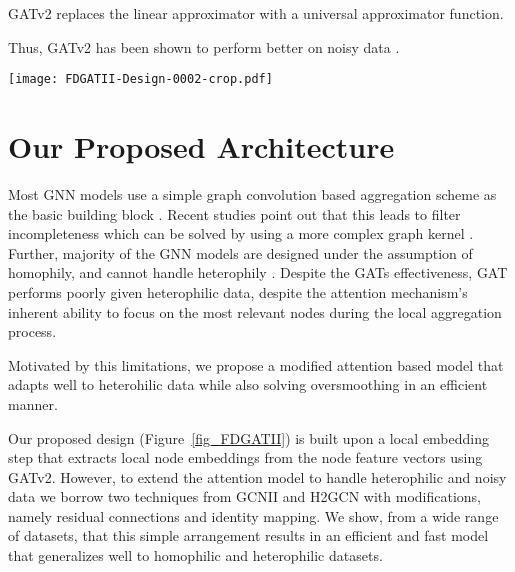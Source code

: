 \documentclass{article}
\begin{document}
GATv2 replaces the linear approximator with a universal approximator function. 
 
Thus, GATv2 has been shown to perform better on noisy data \cite{brody2021attentive}.

\begin{figure*}[t]
  \texttt{[image: FDGATII-Design-0002-crop.pdf]}
  \caption{FDGATII uses an initial representation obtained from the node features via  projection combined with attention and Identity  with  and  proportions respectively at each layer. The attention module concatenates source (row) and destination (column) features of each edge from the adjacency matrix  (with self-edges) projected via , applies a non-linearity (leaky-relu) followed by an  to obtain the edgewise attentions which is reshaped to a matrix suitable for the final softmax with the query. FDGATII can have multiple layers, followed by a final  projection (layer) and log softmax that provides the node classification.}
  \label{fig_FDGATII}
\end{figure*}

\section{Our Proposed Architecture}
Most GNN models use a simple graph convolution based aggregation scheme as the basic building block \cite{kipf2016semi, hamilton2017inductive}. Recent studies point out that this leads to filter incompleteness which can be solved by using a more complex graph kernel \cite{abu2019mixhop}. Further, majority of the GNN models are designed under the assumption of homophily, and cannot handle heterophily \cite{zhu2020beyond}. Despite the GATs effectiveness, GAT performs poorly given heterophilic data, despite the attention mechanism’s inherent ability to focus on the most relevant nodes during the local aggregation process. 

Motivated by this limitations, we propose a modified attention based model that adapts well to heterohilic data while also solving oversmoothing in an efficient manner. 

Our proposed design (Figure~\ref{fig_FDGATII}) is built upon a local embedding step that extracts local node embeddings from the node feature vectors using GATv2. However, to extend the attention model to handle heterophilic and noisy data we borrow two techniques from GCNII \cite{chen2020simple} and H2GCN \cite{zhu2020beyond} with modifications, namely residual connections and identity mapping. We show, from a wide range of datasets, that this simple arrangement results in an efficient and fast model that generalizes well to homophilic and heterophilic datasets. 
\end{document}
